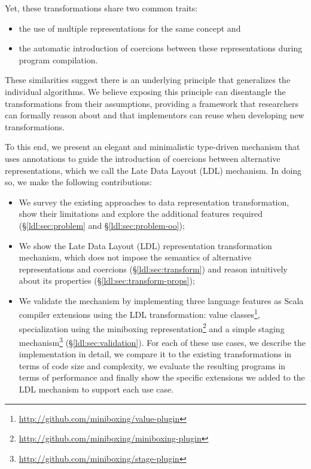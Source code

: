 Yet, these transformations share two common traits:

\begin{itemize}
\item[(1)] the use of multiple representations for the same concept and
\item[(2)] the automatic introduction of coercions between these representations during program compilation.
\end{itemize}

These similarities suggest there is an underlying principle that generalizes the individual algorithms. We believe exposing this principle can disentangle the transformations from their assumptions, providing a framework that researchers can formally reason about and that implementors can reuse when developing new transformations.

To this end, we present an elegant and minimalistic type-driven mechanism that uses annotations to guide the introduction of coercions between alternative representations, which we call the Late Data Layout (LDL) mechanism. In doing so, we make the following contributions:

\begin{itemize}
\item We survey the existing approaches to data representation transformation, show their limitations and explore the additional features required (\S\ref{ldl:sec:problem} and \S\ref{ldl:sec:problem-oo});
\item We show the Late Data Layout (LDL) representation transformation mechanism, which does not impose the semantics of alternative representations and coercions (\S\ref{ldl:sec:transform}) and reason intuitively about its properties (\S\ref{ldl:sec:transform-props});
\item We validate the mechanism by implementing three language features as Scala compiler extensions using the LDL transformation: value classes\footnote{\url{http://github.com/miniboxing/value-plugin}}, specialization using the miniboxing representation\footnote{\url{http://github.com/miniboxing/miniboxing-plugin}} and a simple staging mechanism\footnote{\url{http://github.com/miniboxing/stage-plugin}} (\S\ref{ldl:sec:validation}). For each of these use cases, we describe the implementation in detail, we compare it to the existing transformations in terms of code size and complexity, we evaluate the resulting programs in terms of performance and finally show the specific extensions we added to the LDL mechanism to support each use case.
\end{itemize}

